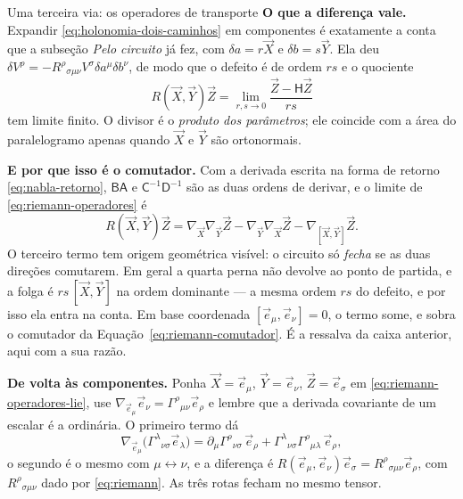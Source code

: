 \documentclass[12pt,a4paper,oneside]{book}
\theoremstyle{rgplain}
\theoremstyle{rgremark}
\begin{document}
\begin{interludio}{Uma terceira via: os operadores de transporte}
\textbf{O que a diferença vale.} Expandir \eqref{eq:holonomia-dois-caminhos}
em componentes é exatamente a conta que a subseção \emph{Pelo circuito} já
fez, com $\delta a=r\vec X$ e $\delta b=s\vec Y$. Ela deu
$\delta V^\rho=-R^\rho{}_{\sigma\mu\nu}V^\sigma\delta a^\mu\delta b^\nu$,
de modo que o defeito é de ordem $rs$ e o quociente
\begin{equation}
  R(\vec X,\vec Y)\vec Z
  =\lim_{r,s\to0}\frac{\vec Z-\mathsf H\vec Z}{rs}
  \label{eq:riemann-operadores}
\end{equation}
tem limite finito. O divisor é o \emph{produto dos parâmetros}; ele coincide
com a área do paralelogramo apenas quando $\vec X$ e $\vec Y$ são
ortonormais.

\textbf{E por que isso é o comutador.} Com a derivada escrita na forma de
retorno \eqref{eq:nabla-retorno}, $\mathsf{BA}$ e
$\mathsf C^{-1}\mathsf D^{-1}$ são as duas ordens de derivar, e o limite
de \eqref{eq:riemann-operadores} é
\begin{equation}
  R(\vec X,\vec Y)\vec Z
  =\nabla_{\vec X}\nabla_{\vec Y}\vec Z
  -\nabla_{\vec Y}\nabla_{\vec X}\vec Z
  -\nabla_{[\vec X,\vec Y]}\vec Z .
  \label{eq:riemann-operadores-lie}
\end{equation}
O terceiro termo tem origem geométrica visível: o circuito só \emph{fecha}
se as duas direções comutarem. Em geral a quarta perna não devolve ao ponto
de partida, e a folga é $rs\,[\vec X,\vec Y]$ na ordem dominante --- a mesma
ordem $rs$ do defeito, e por isso ela entra na conta. Em base coordenada
$[\vec e_\mu,\vec e_\nu]=0$, o termo some, e sobra o comutador da
Equação~\eqref{eq:riemann-comutador}. É a ressalva da caixa anterior, aqui
com a sua razão.

\textbf{De volta às componentes.} Ponha $\vec X=\vec e_\mu$,
$\vec Y=\vec e_\nu$, $\vec Z=\vec e_\sigma$ em
\eqref{eq:riemann-operadores-lie}, use
$\nabla_{\vec e_\mu}\vec e_\nu=\Gamma^\rho{}_{\mu\nu}\vec e_\rho$ e lembre
que a derivada covariante de um escalar é a ordinária. O primeiro termo dá
\[
  \nabla_{\vec e_\mu}\bigl(\Gamma^\lambda{}_{\nu\sigma}\vec e_\lambda\bigr)
  =\partial_\mu\Gamma^\rho{}_{\nu\sigma}\,\vec e_\rho
  +\Gamma^\lambda{}_{\nu\sigma}\Gamma^\rho{}_{\mu\lambda}\,\vec e_\rho ,
\]
o segundo é o mesmo com $\mu\leftrightarrow\nu$, e a diferença é
$R(\vec e_\mu,\vec e_\nu)\vec e_\sigma=R^\rho{}_{\sigma\mu\nu}\vec e_\rho$,
com $R^\rho{}_{\sigma\mu\nu}$ dado por \eqref{eq:riemann}. As três rotas
fecham no mesmo tensor.
\end{interludio}
\end{document}

